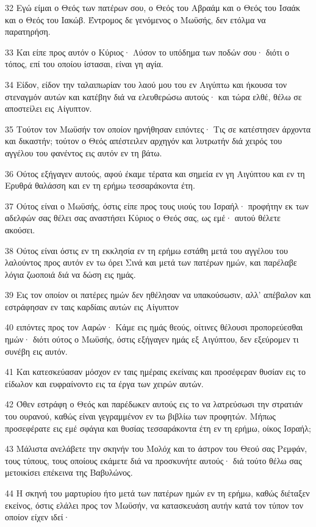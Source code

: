 \par 32 Εγώ είμαι ο Θεός των πατέρων σου, ο Θεός του Αβραάμ και ο Θεός του Ισαάκ και ο Θεός του Ιακώβ. Έντρομος δε γενόμενος ο Μωϋσής, δεν ετόλμα να παρατηρήση.
\par 33 Και είπε προς αυτόν ο Κύριος· Λύσον το υπόδημα των ποδών σου· διότι ο τόπος, επί του οποίου ίστασαι, είναι γη αγία.
\par 34 Είδον, είδον την ταλαιπωρίαν του λαού μου του εν Αιγύπτω και ήκουσα τον στεναγμόν αυτών και κατέβην διά να ελευθερώσω αυτούς· και τώρα ελθέ, θέλω σε αποστείλει εις Αίγυπτον.
\par 35 Τούτον τον Μωϋσήν τον οποίον ηρνήθησαν ειπόντες· Τις σε κατέστησεν άρχοντα και δικαστήν; τούτον ο Θεός απέστειλεν αρχηγόν και λυτρωτήν διά χειρός του αγγέλου του φανέντος εις αυτόν εν τη βάτω.
\par 36 Ούτος εξήγαγεν αυτούς, αφού έκαμε τέρατα και σημεία εν γη Αιγύπτου και εν τη Ερυθρά θαλάσση και εν τη ερήμω τεσσαράκοντα έτη.
\par 37 Ούτος είναι ο Μωϋσής, όστις είπε προς τους υιούς του Ισραήλ· προφήτην εκ των αδελφών σας θέλει σας αναστήσει Κύριος ο Θεός σας, ως εμέ· αυτού θέλετε ακούσει.
\par 38 Ούτος είναι όστις εν τη εκκλησία εν τη ερήμω εστάθη μετά του αγγέλου του λαλούντος προς αυτόν εν τω όρει Σινά και μετά των πατέρων ημών, και παρέλαβε λόγια ζωοποιά διά να δώση εις ημάς.
\par 39 Εις τον οποίον οι πατέρες ημών δεν ηθέλησαν να υπακούσωσιν, αλλ' απέβαλον και εστράφησαν εν ταις καρδίαις αυτών εις Αίγυπτον
\par 40 ειπόντες προς τον Ααρών· Κάμε εις ημάς θεούς, οίτινες θέλουσι προπορεύεσθαι ημών· διότι ούτος ο Μωϋσής, όστις εξήγαγεν ημάς εξ Αιγύπτου, δεν εξεύρομεν τι συνέβη εις αυτόν.
\par 41 Και κατεσκεύασαν μόσχον εν ταις ημέραις εκείναις και προσέφεραν θυσίαν εις το είδωλον και ευφραίνοντο εις τα έργα των χειρών αυτών.
\par 42 Όθεν εστράφη ο Θεός και παρέδωκεν αυτούς εις το να λατρεύσωσι την στρατιάν του ουρανού, καθώς είναι γεγραμμένον εν τω βιβλίω των προφητών. Μήπως προσεφέρατε εις εμέ σφάγια και θυσίας τεσσαράκοντα έτη εν τη ερήμω, οίκος Ισραήλ;
\par 43 Μάλιστα ανελάβετε την σκηνήν του Μολόχ και το άστρον του Θεού σας Ρεμφάν, τους τύπους, τους οποίους εκάμετε διά να προσκυνήτε αυτούς· διά τούτο θέλω σας μετοικίσει επέκεινα της Βαβυλώνος.
\par 44 Η σκηνή του μαρτυρίου ήτο μετά των πατέρων ημών εν τη ερήμω, καθώς διέταξεν εκείνος, όστις ελάλει προς τον Μωϋσήν, να κατασκευάση αυτήν κατά τον τύπον τον οποίον είχεν ιδεί·
